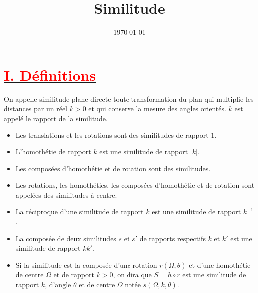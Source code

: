 \documentclass[12pt]{article}
\title{\textbf{Similitude}}
\date{\today}
\begin{document}
\maketitle
\newpage
\section*{\underline{\textbf{\textcolor{red}{I. Définitions}}}}
On appelle similitude plane directe toute transformation du plan qui multiplie les distances par un réel $k > 0$ et qui conserve la mesure des angles orientés. $k$ est appelé le rapport de la similitude.
\begin{itemize}
    \item Les translations et les rotations sont des similitudes de rapport $1$.
    \item L'homothétie de rapport $k$ est une similitude de rapport $|k|$.
    \item Les composées d'homothétie et de rotation sont des similitudes.
    \item Les rotations, les homothéties, les composées d'homothétie et de rotation sont appelées des similitudes à centre.
    \item La réciproque d'une similitude de rapport $k$ est une similitude de rapport $k^{-1}$.
    \item La composée de deux similitudes $s$ et $s'$ de rapports respectifs $k$ et $k'$ est une similitude de rapport $kk'$.
    \item Si la similitude est la composée d'une rotation $r(\Omega,\theta)$ et d'une homothétie de centre $\Omega$ et de rapport $k > 0$, on dira que $S = h \circ r$ est une similitude de rapport $k$, d'angle $\theta$ et de centre $\Omega$ notée $s(\Omega,k,\theta)$.
\end{itemize}
\end{document}
